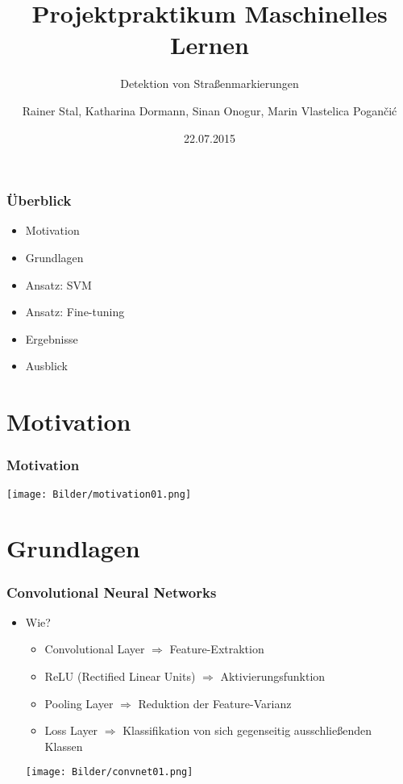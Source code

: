 \documentclass[t]{beamer}
\date{22.07.2015}
\title[Projektpraktikum Maschinelles Lernen]{Projektpraktikum Maschinelles Lernen}
\subtitle{Detektion von Straßenmarkierungen}
\author{Rainer Stal, Katharina Dormann, Sinan Onogur, Marin Vlastelica Pogančić}
\institute{Forschungszentrum Informatik}
\begin{document}
\begin{frame}
  \maketitle
\end{frame}

\begin{frame}
\frametitle{Überblick}
\begin{itemize}
	\setlength{\itemsep}{20pt}
	\item Motivation
	\item Grundlagen
	\item Ansatz: SVM
	\item Ansatz: Fine-tuning
	\item Ergebnisse
	\item Ausblick
\end{itemize}
\end{frame}

\section{Motivation}
\begin{frame}
	\frametitle{Motivation}
	\hspace{5mm}
	\texttt{[image: Bilder/motivation01.png]}
\end{frame}

\section{Grundlagen}
\begin{frame}
	\frametitle{Convolutional Neural Networks}
	\begin{itemize}
	\item Wie?
	\begin{itemize}
	\item Convolutional Layer $\Rightarrow$ Feature-Extraktion
	\item ReLU (Rectified Linear Units) $\Rightarrow$ Aktivierungsfunktion
	\item Pooling Layer $\Rightarrow$ Reduktion der Feature-Varianz
	\item Loss Layer $\Rightarrow$ Klassifikation von sich gegenseitig ausschließenden Klassen
	\end{itemize}
	\bigskip
	\hspace{3mm}
	\texttt{[image: Bilder/convnet01.png]}
	\end{itemize}
\end{frame}
\end{document}
